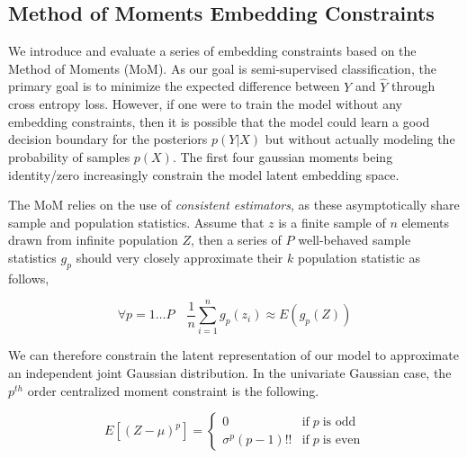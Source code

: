 \documentclass[10pt,twocolumn,letterpaper]{article}
\begin{document}

\subsection{Method of Moments Embedding Constraints}

We introduce and evaluate a series of embedding constraints based on the Method of Moments (MoM). 
As our goal is semi-supervised classification, the primary goal is to minimize the expected difference between $Y$ and $\hat{Y}$ through cross entropy loss. 
However, if one were to train the model without any embedding constraints, then it is possible that the model could learn a good decision boundary for the posteriors $p(Y|X)$ but without actually modeling the probability of samples $p(X)$.
The first four gaussian moments being identity/zero increasingly constrain the model latent embedding space.

The MoM relies on the use of \textit{consistent estimators}, as these asymptotically share sample and population statistics.   Assume that $z$ is a finite sample of $n$ elements drawn from infinite population $Z$, then a series of $P$ well-behaved sample statistics $g_p$ should very closely approximate their $k$ population statistic as follows,

\begin{equation}
	\forall p=1 \dots P \quad
	\frac{1}{n} \sum_{i=1}^n g_p(z_i) \approx E(g_p(Z))
\end{equation}

We can therefore constrain the latent representation of our model to approximate an independent joint Gaussian distribution. In the univariate Gaussian case, the $p^{th}$ order centralized moment constraint is the following.

\begin{equation}
	E\left[ (Z-\mu)^p \right] = 
	\begin{cases} 
		0 &  \text{if} \; p \; \text{is odd} \\
		\sigma^p(p - 1)!! & \text{if} \; p \; \text{is even}
	\end{cases}
\end{equation}
\end{document}

